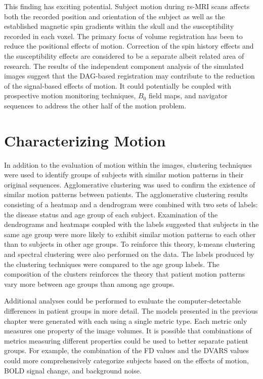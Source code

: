 This finding has exciting potential. Subject motion during rs-MRI scans affects both the recorded position and orientation of the subject as well as the established magnetic spin gradients within the skull and the susceptibility recorded in each voxel. The primary focus of volume registration has been to reduce the positional effects of motion. Correction of the spin history effects and the susceptibility effects are considered to be a separate albeit related area of research. The results of the independent component analysis of the simulated images suggest that the DAG-based registration may contribute to the reduction of the signal-based effects of motion. It could potentially be coupled with prospective motion monitoring techniques, $B_0$ field maps, and navigator sequences to address the other half of the motion problem.

\section{Characterizing Motion}

In addition to the evaluation of motion within the images, clustering techniques were used to identify groups of subjects with similar motion patterns in their original sequences. Agglomerative clustering was used to confirm the existence of similar motion patterns between patients. The agglomerative clustering results consisting of a heatmap and a dendrogram were combined with two sets of labels: the disease status and age group of each subject. Examination of the dendrograms and heatmaps coupled with the labels suggested that subjects in the same age group were more likely to exhibit similar motion patterns to each other than to subjects in other age groups. To reinforce this theory, k-means clustering and spectral clustering were also performed on the data. The labels produced by the clustering techniques were compared to the age group labels. The composition of the clusters reinforces the theory that patient motion patterns vary more between age groups than among age groups.

Additional analyses could be performed to evaluate the computer-detectable differences in patient groups in more detail. The models presented in the previous chapter were generated with each using a single metric type. Each metric only measures one property of the image volumes. It is possible that combinations of metrics measuring different properties could be used to better separate patient groups. For example, the combination of the FD values and the DVARS values could more comprehensively categorize subjects based on the effects of motion, BOLD signal change, and background noise.


